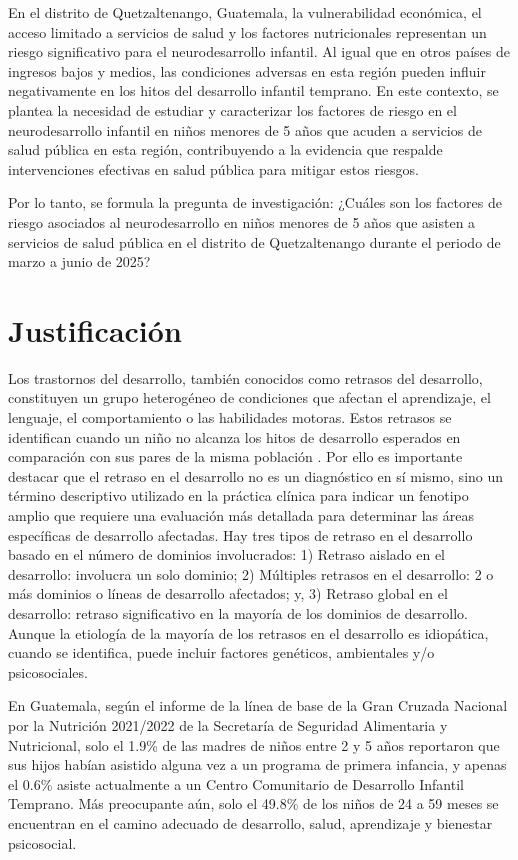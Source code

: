 \documentclass[11pt,letterpaper]{report}
\newcommand{\tiempito}{marzo a junio de 2025}
\begin{document}
En el distrito de Quetzaltenango, Guatemala, la vulnerabilidad económica, el
acceso limitado a servicios de salud y los factores nutricionales representan
un riesgo significativo para el neurodesarrollo infantil. Al igual que en otros
países de ingresos bajos y medios, las condiciones adversas en esta región
pueden influir negativamente en los hitos del desarrollo infantil temprano. En
este contexto, se plantea la necesidad de estudiar y caracterizar los factores
de riesgo en el neurodesarrollo infantil en niños menores de 5 años que acuden
a servicios de salud pública en esta región, contribuyendo a la evidencia que
respalde intervenciones efectivas en salud pública para mitigar estos riesgos.

Por lo tanto, se formula la pregunta de investigación: ¿Cuáles son los factores
de riesgo asociados al neurodesarrollo en niños menores de 5 años que asisten a
servicios de salud pública en el distrito de Quetzaltenango durante el periodo
de \tiempito?

	\chapter*{Justificación}
Los trastornos del desarrollo, también conocidos como retrasos del desarrollo,
constituyen un grupo heterogéneo de condiciones que afectan el aprendizaje, el
lenguaje, el comportamiento o las habilidades motoras.
\cite{cdcDevelopmentalDisability} Estos retrasos se identifican cuando un niño
no alcanza los hitos de desarrollo esperados en comparación con sus pares de la
misma población \cite{DevelopmentalSurveillance}. Por ello es importante
destacar que el retraso en el desarrollo no es un diagnóstico en sí mismo, sino
un término descriptivo utilizado en la práctica clínica para indicar un
fenotipo amplio que requiere una evaluación más detallada para determinar las
áreas específicas de desarrollo afectadas. Hay tres tipos de retraso en el
desarrollo basado en el número de dominios involucrados: 1) Retraso aislado en
el desarrollo: involucra un solo dominio; 2) Múltiples retrasos en el
desarrollo: 2 o más dominios o líneas de desarrollo afectados; y, 3) Retraso
global en el desarrollo: retraso significativo en la mayoría de los dominios de
desarrollo. \cite{Bellman2013} Aunque la etiología de la mayoría de los
retrasos en el desarrollo es idiopática, cuando se identifica, puede incluir
factores genéticos, ambientales y/o psicosociales. \cite{DevelopmentalDelay}

En Guatemala, según el informe de la línea de base de la Gran Cruzada Nacional
por la Nutrición 2021/2022 de la Secretaría de Seguridad Alimentaria y
Nutricional, solo el 1.9\% de las madres de niños entre 2 y 5 años reportaron
que sus hijos habían asistido alguna vez a un programa de primera infancia, y
apenas el 0.6\% asiste actualmente a un Centro Comunitario de Desarrollo
Infantil Temprano. Más preocupante aún, solo el 49.8\% de los niños de 24 a 59
meses se encuentran en el camino adecuado de desarrollo, salud, aprendizaje y
bienestar psicosocial. \cite{SESAN2022}
\end{document}
